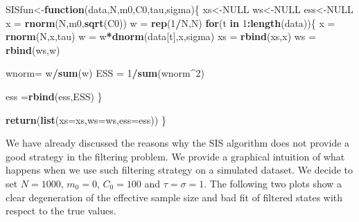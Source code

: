 \documentclass[
]{book}
\newenvironment{Shaded}{\begin{snugshade}}{\end{snugshade}}
\newcommand{\ControlFlowTok}[1]{\textcolor[rgb]{0.13,0.29,0.53}{\textbf{#1}}}
\newcommand{\DataTypeTok}[1]{\textcolor[rgb]{0.13,0.29,0.53}{#1}}
\newcommand{\DecValTok}[1]{\textcolor[rgb]{0.00,0.00,0.81}{#1}}
\newcommand{\KeywordTok}[1]{\textcolor[rgb]{0.13,0.29,0.53}{\textbf{#1}}}
\newcommand{\NormalTok}[1]{#1}
\newcommand{\OperatorTok}[1]{\textcolor[rgb]{0.81,0.36,0.00}{\textbf{#1}}}
\newcommand{\OtherTok}[1]{\textcolor[rgb]{0.56,0.35,0.01}{#1}}
\newcommand{\StringTok}[1]{\textcolor[rgb]{0.31,0.60,0.02}{#1}}
\theoremstyle{break}
\theoremstyle{nonumberplain}
\begin{document}
\begin{Shaded}
\begin{Highlighting}[]
\NormalTok{SISfun<-}\ControlFlowTok{function}\NormalTok{(data,N,m0,C0,tau,sigma)\{}
\NormalTok{  xs<-}\OtherTok{NULL}
\NormalTok{  ws<-}\OtherTok{NULL}
\NormalTok{  ess<-}\OtherTok{NULL}
\NormalTok{  x  =}\StringTok{ }\KeywordTok{rnorm}\NormalTok{(N,m0,}\KeywordTok{sqrt}\NormalTok{(C0))}
\NormalTok{  w  =}\StringTok{ }\KeywordTok{rep}\NormalTok{(}\DecValTok{1}\OperatorTok{/}\NormalTok{N,N)}
  \ControlFlowTok{for}\NormalTok{(t }\ControlFlowTok{in} \DecValTok{1}\OperatorTok{:}\KeywordTok{length}\NormalTok{(data))\{}
\NormalTok{    x    =}\StringTok{ }\KeywordTok{rnorm}\NormalTok{(N,x,tau)                   }
\NormalTok{    w    =}\StringTok{ }\NormalTok{w}\OperatorTok{*}\KeywordTok{dnorm}\NormalTok{(data[t],x,sigma)         }
\NormalTok{    xs =}\StringTok{ }\KeywordTok{rbind}\NormalTok{(xs,x)}
\NormalTok{    ws =}\StringTok{ }\KeywordTok{rbind}\NormalTok{(ws,w)}
    
\NormalTok{    wnorm=}\StringTok{ }\NormalTok{w}\OperatorTok{/}\KeywordTok{sum}\NormalTok{(w)                         }
\NormalTok{    ESS  =}\StringTok{ }\DecValTok{1}\OperatorTok{/}\KeywordTok{sum}\NormalTok{(wnorm}\OperatorTok{^}\DecValTok{2}\NormalTok{)                   }
    
\NormalTok{    ess =}\KeywordTok{rbind}\NormalTok{(ess,ESS)}
\NormalTok{  \}}
  
  \KeywordTok{return}\NormalTok{(}\KeywordTok{list}\NormalTok{(}\DataTypeTok{xs=}\NormalTok{xs,}\DataTypeTok{ws=}\NormalTok{ws,}\DataTypeTok{ess=}\NormalTok{ess))}
\NormalTok{\}}
\end{Highlighting}
\end{Shaded}

We have already discussed the reasons why the SIS algorithm does not
provide a good strategy in the filtering problem. We provide a graphical
intuition of what happens when we use such filtering strategy on a
simulated dataset. We decide to set \(N=1000\), \(m_{0}=0\),
\(C_{0}=100\) and \(\tau=\sigma=1\). The following two plots show a
clear degeneration of the effective sample size and bad fit of filtered
states with respect to the true values.
\end{document}
